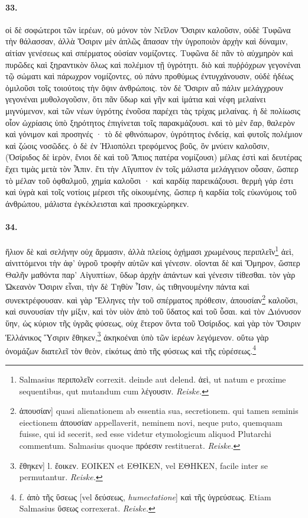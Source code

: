 \documentclass[a4paper, 11pt, oneside, polutonikogreek, german, landscape]{article}
\begin{document}
\paragraph{33.}
οἱ δὲ σοφώτεροι τῶν ἱερέων, οὐ μόνον τὸν Νεῖλον Ὄσιριν καλοῦσιν, οὐδὲ Τυφῶνα τὴν θάλασσαν, ἀλλὰ Ὄσιριν μὲν ἁπλῶς ἅπασαν τὴν ὑγροποιὸν ἀρχὴν καὶ δύναμιν, αἰτίαν γενέσεως καὶ σπέρματος οὐσίαν νομίζοντες. Τυφῶνα δὲ πᾶν τὸ αὐχμηρὸν καὶ πυρῶδες καὶ ξηραντικὸν ὅλως καὶ πολέμιον τῇ ὑγρότητι. διὸ καὶ πυῤῥόχρων γεγονέναι τῷ σώματι καὶ πάρωχρον νομίζοντες, οὐ πάνυ προθύμως ἐντυγχάνουσιν, οὐδὲ ἡδέως ὁμιλοῦσι τοῖς τοιούτοις τὴν ὄψιν ἀνθρώποις. τὸν δὲ Ὄσιριν αὖ πάλιν μελάγχρουν γεγονέναι μυθολογοῦσιν, ὅτι πᾶν ὕδωρ καὶ γῆν καὶ ἱμάτια καὶ νέφη μελαίνει μιγνύμενον, καὶ τῶν νέων ὑγρότης ἐνοῦσα παρέχει τὰς τρίχας μελαίνας. ἡ δὲ πολίωσις οἷον ὠχρίασις ὑπὸ ξηρότητος ἐπιγίνεται τοῖς παρακμάζουσι. καὶ τὸ μὲν ἔαρ, θαλερὸν καὶ γόνιμον καὶ προσηνές · τὸ δὲ φθινόπωρον, ὑγρότητος ἐνδείᾳ, καὶ φυτοῖς πολέμιον καὶ ζώοις νοσῶδες. ὁ δὲ ἐν Ἡλιοπόλει τρεφόμενος βοῦς, ὃν μνύειν καλοῦσιν, (Ὀσίριδος δὲ ἱερὸν, ἔνιοι δὲ καὶ τοῦ Ἄπιος πατέρα νομίζουσι) μέλας ἐστὶ καὶ δευτέρας ἔχει τιμὰς μετὰ τὸν Ἆπιν. ἔτι τὴν Αἴγυπτον ἐν τοῖς μάλιστα μελάγγειον οὖσαν, ὥσπερ τὸ μέλαν τοῦ ὀφθαλμοῦ, χημία καλοῦσι · καὶ καρδίᾳ παρεικάζουσι. θερμὴ γάρ ἐστι καὶ ὑγρὰ καὶ τοῖς νοτίοις μέρεσι τῆς οἰκουμένης, ὥσπερ ἡ καρδία τοῖς εὐωνύμοις τοῦ ἀνθρώπου, μάλιστα ἐγκέκλεισται καὶ προσκεχώρηκεν.

\paragraph{34.}
ἥλιον δὲ καὶ σελήνην οὐχ ἅρμασιν, ἀλλὰ πλείοις ὀχήμασι χρωμένους περιπλεῖν\footnote{Salmasius περιπολεῖν correxit. deinde aut delend. ἁεὶ, ut natum e proxime sequentibus, qut mutandum cum λέγουσιν. \emph{Reiske.}} ἀεὶ, αἰνιττόμενοι τὴν ἀφ' ὑγροῦ τροφὴν αὐτῶν καὶ γένεσιν. οἴονται δὲ καὶ Ὅμηρον, ὥσπερ Θαλῆν μαθόντα παρ' Αἰγυπτίων, ὕδωρ ἀρχὴν ἁπάντων καὶ γένεσιν τίθεσθαι. τὸν γὰρ Ὠκεανὸν Ὄσιριν εἶναι, τὴν δὲ Τηθὺν Ἶσιν, ὡς τιθηνουμένην πάντα καὶ συνεκτρέφουσαν. καὶ γὰρ Ἕλληνες τὴν τοῦ σπέρματος πρόθεσιν, ἀπουσίαν\footnote{ἀπουσίαν] quasi alienationem ab essentia sua, secretionem. qui tamen seminis eiectionem ἀπουσίαν appellaverit, neminem novi, neque puto, quemquam fuisse, qui id secerit, sed esse videtur etymologicum aliquod Plutarchi commentum. Salmasius quoque πρόεσιν restituerat. \emph{Reiske.}} καλοῦσι, καὶ συνουσίαν τὴν μίξιν, καὶ τὸν υἱὸν ἀπὸ τοῦ ὕδατος καὶ τοῦ ὗσαι. καὶ τὸν Διόνυσον ὕην, ὡς κύριον τῆς ὑγρᾶς φύσεως, οὐχ ἕτερον ὄντα τοῦ Ὀσίριδος. καὶ γὰρ τὸν Ὄσιριν Ἑλλάνικος Ὕσιριν ἔθηκεν,\footnote{ἔθηκεν] l. ἔοικεν. ΕΟΙΚΕΝ et ΕΘΙΚΕΝ, vel ΕΘΗΚΕΝ, facile inter se permutantur. \emph{Reiske.}} ἀκηκοέναι ὑπὸ τῶν ἱερέων λεγόμενον. οὕτω γὰρ ὀνομάζων διατελεῖ τὸν θεὸν, εἰκότως ἀπὸ τῆς φύσεως καὶ τῆς εὑρέσεως.\footnote{f. ἀπὸ τῆς ὕσεως [vel δεύσεως, \emph{humectatione}] καὶ τῆς ὑγρεύσεως. Etiam Salmasius ὕσεως correxerat. \emph{Reiske.}}
\end{document}
